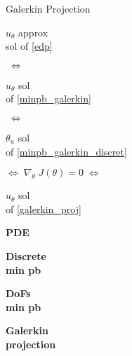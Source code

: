 \begin{frame}{Galerkin Projection}
\begin{center}
\begin{tcolorbox}
			\vspace{5pt}
			
			\begin{minipage}{0.15\linewidth}
				\centering
				$u_\theta$ approx \\
				sol of \eqref{edp}
			\end{minipage} $\; \Leftrightarrow \;$	\begin{minipage}{0.1\linewidth}
				\centering
				$u_\theta$ sol \\
				of \eqref{minpb_galerkin}
			\end{minipage} $\; \Leftrightarrow \;$	\begin{minipage}{0.1\linewidth}
				\centering
				$\theta_u$ sol \\
				of \eqref{minpb_galerkin_discret}
			\end{minipage} $\Leftrightarrow \; \nabla_\theta \; J(\theta)=0 \; \Leftrightarrow$ \begin{minipage}{0.1\linewidth}
				\centering
				$u_\theta$ sol \\
				of \eqref{galerkin_proj}
			\end{minipage}
		
			\vspace{5pt}
		
			\begin{minipage}{0.1\linewidth}
				\centering
				\textbf{PDE}
			\end{minipage} \; \hspace{15pt} \; \begin{minipage}{0.1\linewidth}
				\centering
				\textbf{Discrete} \\
				\textbf{min pb}
			\end{minipage} \; \hspace{10pt} \; \begin{minipage}{0.1\linewidth}
				\centering
				\textbf{DoFs} \\
				\textbf{min pb}
			\end{minipage} \; \hspace{60pt} \; \begin{minipage}{0.1\linewidth}
				\centering
				\textbf{Galerkin} \\
				\textbf{projection}
			\end{minipage}
		\end{tcolorbox}
	\end{center}
\end{frame}

